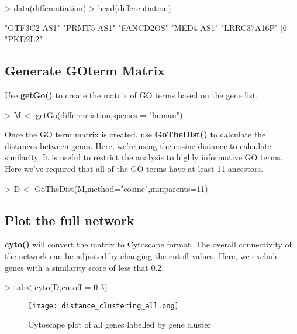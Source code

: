 \documentclass{article}
\begin{document}
\begin{Schunk}
\begin{Sinput}
> data(differentiation)
> head(differentiation)
\end{Sinput}
\begin{Soutput}
[1] "GTF3C2-AS1" "PRMT5-AS1"  "FANCD2OS"   "MED4-AS1"   "LRRC37A16P"
[6] "PKD2L2"    
\end{Soutput}
\end{Schunk}

\subsection*{Generate GOterm Matrix}
Use \textbf{getGo()} to create the matrix of GO terms based on the gene list.
\begin{Schunk}
\begin{Sinput}
> M <- getGo(differentiation,species = "human")
\end{Sinput}
\end{Schunk}


Once the GO term matrix is created, use \textbf{GoTheDist()} to calculate the distances between genes. Here, we're using the cosine distance to calculate similarity. It is useful to restrict the analysis to highly informative GO terms. Here we've required that all of the GO terms have at least 11 ancestors. 
\vspace{5mm}

\begin{Schunk}
\begin{Sinput}
> D <- GoTheDist(M,method="cosine",minparents=11)
\end{Sinput}
\end{Schunk}

\subsection*{Plot the full network}
\textbf{cyto()} will convert the matrix to Cytoscape format. The overall connectivity of the network can be adjusted by changing the cutoff values. Here, we exclude genes with a similarity score of less that 0.2.
\vspace{5mm}
\begin{Schunk}
\begin{Sinput}
> tab<-cyto(D,cutoff = 0.3)
\end{Sinput}
\end{Schunk}
\begin{figure}[ht]
\texttt{[image: distance\_clustering\_all.png]}
\centering
\caption{Cytoscape plot of all genes labelled by gene cluster}
\end{figure}
\end{document}
